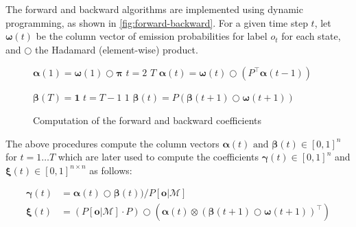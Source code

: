 The forward and backward algorithms are implemented using dynamic programming, as shown in \autoref{fig:forward-backward}.
For a given time step $t$, let $\pmb{\omega}(t)$ be the column vector of emission probabilities for label $o_t$ for each state, and $\bigcirc$ the Hadamard (element-wise) product.

\begin{figure}[h!]
    \centering
    \begin{minipage}{0.45\textwidth}
        \begin{codebox}
            \li $\pmb{\alpha}(1) = \pmb{\omega}(1) \bigcirc \pmb{\pi}$
            \li \For $t = 2$ \To $T$ \Do
            \li $\pmb{\alpha}(t) = \pmb{\omega}(t) \bigcirc \left( P^\top \pmb{\alpha}(t-1) \right)$
            \End
        \end{codebox}%
    \end{minipage}
    \quad
    \begin{minipage}{0.45\textwidth}
        \begin{codebox}
            \li $\pmb{\beta}(T) = \mathbf{1}$
            \li \For $t = T-1$ \To $1$ \Do
            \li $\pmb{\beta}(t) = P \left( \pmb{\beta}(t+1) \bigcirc \pmb{\omega}(t+1) \right)$
            \End
        \end{codebox}
    \end{minipage}
    \caption{Computation of the forward and backward coefficients}
    \label{fig:forward-backward}
\end{figure}

The above procedures compute the column vectors $\pmb{\alpha}(t) \text{ and } \pmb{\beta}(t) \in [0,1]^{n}$ for $t = 1\dots T$ which are later used to compute the coefficients $\pmb{\gamma}(t) \in [0,1]^{n}$ and $\pmb{\xi}(t) \in [0,1]^{n \times n}$ as follows:

\begin{align*}
    \pmb{\gamma}(t) & = \pmb{\alpha}(t) \bigcirc \pmb{\beta}(t)) / P[\mathbf{o} | \mathcal{M}]                                                                   \\%
    \pmb{\xi}(t)    & = (P[\mathbf{o} | \mathcal{M}] \cdot P) \bigcirc \left( \pmb{\alpha}(t) \otimes (\pmb{\beta}(t+1) \bigcirc \pmb{\omega}(t+1))^\top \right) %
\end{align*}

